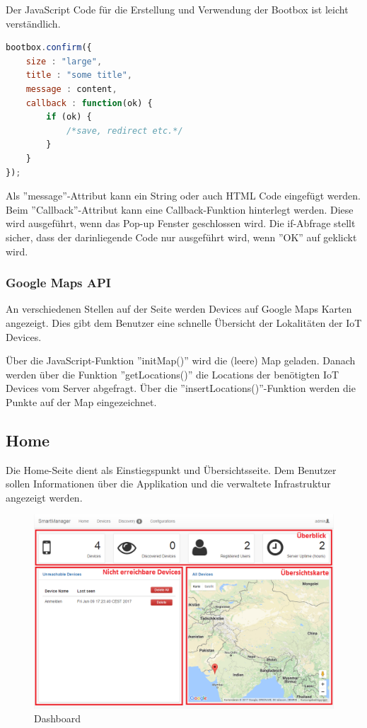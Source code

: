Der JavaScript Code für die Erstellung und Verwendung der Bootbox ist leicht verständlich.

\begin{lstlisting}[language=js]
bootbox.confirm({
	size : "large",
	title : "some title",
	message : content,
	callback : function(ok) {
		if (ok) {
			/*save, redirect etc.*/		
		}
	}
});
\end{lstlisting} 

Als ''message''-Attribut kann ein String oder auch HTML Code eingefügt werden.  Beim ''Callback''-Attribut kann eine Callback-Funktion hinterlegt werden. Diese wird ausgeführt, wenn das Pop-up Fenster geschlossen wird. Die if-Abfrage stellt sicher, dass der darinliegende Code nur ausgeführt wird, wenn ''OK'' auf geklickt wird.

\subsubsection{Google Maps API}
An verschiedenen Stellen auf der Seite werden Devices auf Google Maps Karten angezeigt. Dies gibt dem Benutzer eine schnelle Übersicht der Lokalitäten der IoT Devices.

Über die JavaScript-Funktion ''initMap()'' wird die (leere) Map geladen. Danach werden über die Funktion ''getLocations()'' die Locations der benötigten IoT Devices vom Server abgefragt. Über die ''insertLocations()''-Funktion werden die Punkte auf der Map eingezeichnet.

\subsection{Home}
Die Home-Seite dient als Einstiegspunkt und Übersichtsseite. Dem Benutzer sollen Informationen über die Applikation und die verwaltete Infrastruktur angezeigt werden.

\begin{figure}[H]
\centering
\includegraphics[scale=0.57]{../04_Realisierung/images/userinterface/home.png}
\caption{Dashboard}
\end{figure}

